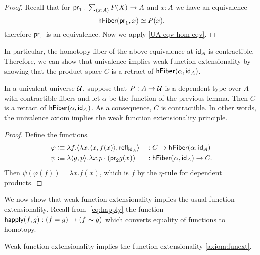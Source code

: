 \begin{proof}
  Recall that for $\proj{1}:\sm{x:A}P(X)\to A$ and $x:A$ we have an equivalence
  \begin{equation*}
    \eqv{\hfiber{\proj{1}}{x}}{P(x)}.
  \end{equation*}
  therefore $\proj{1}$ is an equivalence. Now we apply \autoref{UA-eqv-hom-eqv}.
\end{proof}

In particular, the homotopy fiber of the above equivalence at $\idfunc[A]$ is contractible. Therefore, we can show that univalence implies weak function extensionality by showing that the product space $C$ is a retract of $\hfiber{\alpha}{\idfunc[A]}$.

\begin{thm}
In a univalent universe $\type$, suppose that $P:A\to\type$ is a dependent type over $A$ with contractible fibers and let $\alpha$ be the function of the previous lemma. Then $C$ is a retract of $\hfiber{\alpha}{\idfunc[A]}$. As a consequence, $C$ is contractible. In other words, the univalence axiom implies the weak function extensionality principle.
\end{thm}

\begin{proof}
Define the functions
\begin{align*}
\varphi & \defeq \lambda f.\langle\lambda x.\langle x,f(x)\rangle,\refl{\idfunc[A]}\rangle & & : C\to\hfiber{\alpha}{\idfunc[A]}\\
\psi & \defeq \lambda\langle g,p\rangle.\lambda x.p\cdot(\proj{2} g(x)) & & :
 \hfiber{\alpha}{\idfunc[A]}\to C .
\end{align*}
Then $\psi(\varphi(f))=\lambda x.f(x)$, which is $f$ by the $\eta$-rule for dependent products.
\end{proof}

We now show that weak function extensionality implies the usual function extensionality.
Recall from~\eqref{eq:happly} the function $\happly (f,g) : (f = g)\to(f\htpy g)$ which
converts equality of functions to homotopy.

\begin{thm}
Weak function extensionality implies the function extensionality \autoref{axiom:funext}.
\end{thm}

